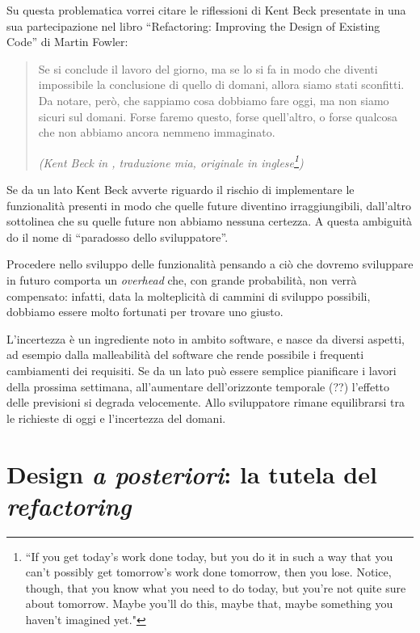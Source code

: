 \documentclass[12pt]{report}
\begin{document}
Su questa problematica vorrei citare le riflessioni di Kent Beck
presentate in una sua partecipazione nel libro ``Refactoring: Improving the 
Design of Existing Code'' di Martin Fowler\cite{fowler2002}:


\begin{quote}
	
	Se si conclude il lavoro del giorno, ma se lo si fa in modo che diventi 
	impossibile la conclusione di quello di domani, allora siamo stati sconfitti.
	Da notare, però, che sappiamo cosa dobbiamo fare oggi, ma non siamo 
	sicuri sul domani. Forse faremo questo, forse quell'altro, o forse qualcosa
	che non abbiamo ancora nemmeno immaginato.
	
	\flushright
	\textit{(Kent Beck in \cite{fowler2002}, traduzione mia, originale in inglese\footnote{
			``If you get today's work done today, but you do it in such a way 
			that you can't possibly get tomorrow's work done tomorrow, then 
			you lose. Notice, though, that you know what you need to do today, 
			but you're not quite sure about tomorrow. Maybe you'll do this, 
			maybe that, maybe something you haven't imagined yet."
		})
	}
\end{quote}

Se da un lato Kent Beck avverte riguardo il rischio di implementare le 
funzionalità presenti in modo che quelle future diventino irraggiungibili,
dall'altro sottolinea che su quelle future non abbiamo nessuna certezza. 
A questa ambiguità do il nome di ``paradosso dello sviluppatore''.

Procedere nello sviluppo delle funzionalità pensando a ciò che dovremo
sviluppare in futuro comporta un \textit{overhead} che, con
grande probabilità, non verrà compensato: infatti, data la molteplicità
di cammini di sviluppo possibili, dobbiamo essere molto fortunati per
trovare uno giusto.

L'incertezza è un ingrediente noto in ambito software, e nasce da diversi
aspetti, ad esempio dalla malleabilità del software che rende possibile
i frequenti cambiamenti dei requisiti. Se da un lato può essere semplice 
pianificare i lavori della prossima settimana, all'aumentare dell'orizzonte 
temporale (??) l'effetto delle previsioni si degrada velocemente. Allo 
sviluppatore rimane equilibrarsi tra le richieste di oggi e l'incertezza
del domani.

\section{Design \textit{a posteriori}: la tutela del \textit{refactoring}}
\end{document}
